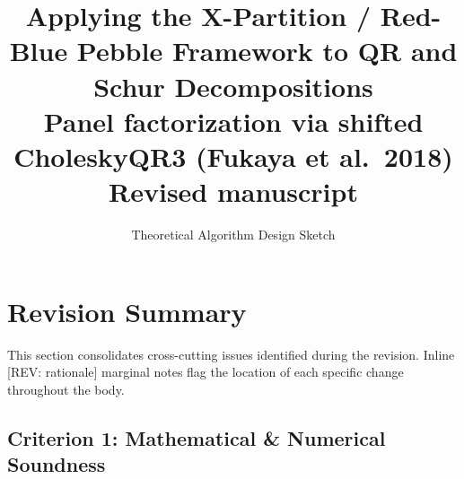 \documentclass[11pt]{article}
\title{Applying the X-Partition / Red-Blue Pebble Framework to QR and Schur Decompositions\\[4pt]
\large\textnormal{Panel factorization via shifted CholeskyQR3 (Fukaya et al.~2018)}\\[4pt]
\normalsize\textnormal{Revised manuscript}}
\author{Theoretical Algorithm Design Sketch}
\date{}
\newcommand{\REV}[1]{\textcolor{blue!60!black}{\small\textsf{[REV: #1]}}}
\begin{document}
\maketitle
\tableofcontents
\newpage

\section*{Revision Summary}

This section consolidates cross-cutting issues identified during the
revision. Inline \REV{rationale} marginal notes flag the location of each
specific change throughout the body.

\subsection*{Criterion 1: Mathematical \& Numerical Soundness}
\end{document}
